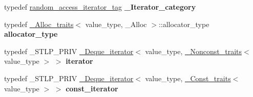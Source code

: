 \begin{DoxyCompactItemize}
typedef \hyperlink{structrandom__access__iterator__tag}{random\+\_\+access\+\_\+iterator\+\_\+tag} {\bfseries \+\_\+\+Iterator\+\_\+category}
\item 
\mbox{\label{classdeque_a291e13a61cac62b06a51f09722be1b7d}} 
typedef \hyperlink{struct___alloc__traits}{\+\_\+\+Alloc\+\_\+traits}$<$ value\+\_\+type, \+\_\+\+Alloc $>$\+::allocator\+\_\+type {\bfseries allocator\+\_\+type}
\item 
\mbox{\label{classdeque_ab2a882c49bc8540cd3ce535690e7c7de}} 
typedef \+\_\+\+S\+T\+L\+P\+\_\+\+P\+R\+IV \hyperlink{struct___deque__iterator}{\+\_\+\+Deque\+\_\+iterator}$<$ value\+\_\+type, \hyperlink{struct___nonconst__traits}{\+\_\+\+Nonconst\+\_\+traits}$<$ value\+\_\+type $>$ $>$ {\bfseries iterator}
\item 
\mbox{\label{classdeque_a9b8f6cf9650706b8c32a082d09d9d915}} 
typedef \+\_\+\+S\+T\+L\+P\+\_\+\+P\+R\+IV \hyperlink{struct___deque__iterator}{\+\_\+\+Deque\+\_\+iterator}$<$ value\+\_\+type, \hyperlink{struct___const__traits}{\+\_\+\+Const\+\_\+traits}$<$ value\+\_\+type $>$ $>$ {\bfseries const\+\_\+iterator}
\end{DoxyCompactItemize}

